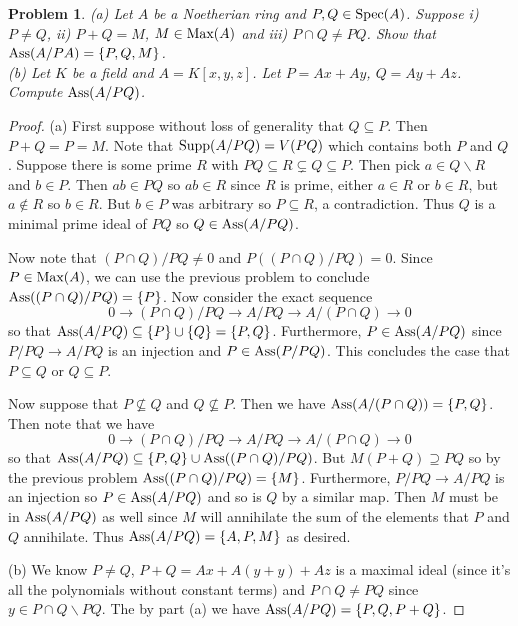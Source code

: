 \documentclass{article}
\newcommand{\ass}{\textup{Ass}}
\newcommand{\supp}{\textup{Supp}}
\newcommand{\spec}{\textup{Spec}}
\newcommand{\Max}{\textup{Max}}
\newtheorem{problem}{Problem}
\begin{document}
\begin{problem}
(a) Let $A$ be a Noetherian ring and $P,Q \in \spec(A)$. Suppose i) $P \neq Q$, ii) $P + Q = M$, $M \in \Max(A)$ and iii) $P \cap Q \neq PQ$. Show that $\ass(A/PA) = \{P, Q, M\}$.\\
(b) Let $K$ be a field and $A = K[x,y,z]$. Let $P = Ax + Ay$, $Q = Ay + Az$. Compute $\ass(A/PQ)$.
\end{problem}
\begin{proof}
(a) First suppose without loss of generality that $Q \subseteq P$. Then $P + Q = P = M$. Note that $\supp(A/PQ) = V(PQ)$ which contains both $P$ and $Q$. Suppose there is some prime $R$ with $PQ \subseteq R \subsetneq Q \subseteq P$. Then pick $a \in Q \backslash R$ and $b \in P$. Then $ab \in PQ$ so $ab \in R$ since $R$ is prime, either $a \in R$ or $b \in R$, but $a \notin R$ so $b \in R$. But $b \in P$ was arbitrary so $P \subseteq R$, a contradiction. Thus $Q$ is a minimal prime ideal of $PQ$ so $Q \in \ass(A/PQ)$.

Now note that $(P \cap Q)/PQ \neq 0$ and $P((P \cap Q)/PQ) = 0$. Since $P \in \Max(A)$, we can use the previous problem to conclude $\ass((P \cap Q)/PQ) = \{P\}$. Now consider the exact sequence
\[
0 \to (P \cap Q)/PQ \to A/PQ \to A/(P \cap Q) \to 0
\]
so that $\ass(A/PQ) \subseteq \{P\} \cup \{Q\} = \{P,Q\}$. Furthermore, $P \in \ass(A/PQ)$ since $P/PQ \to A/PQ$ is an injection and $P \in \ass(P/PQ)$. This concludes the case that $P \subseteq Q$ or $Q \subseteq P$.

Now suppose that $P \nsubseteq Q$ and $Q \nsubseteq P$. Then we have $\ass(A/(P \cap Q)) = \{P, Q\}$. Then note that we have
\[
0 \to (P \cap Q)/PQ \to A/PQ \to A/(P \cap Q) \to 0
\]
so that $\ass(A/PQ) \subseteq \{P, Q\} \cup \ass((P \cap Q)/PQ)$. But $M(P + Q) \supseteq PQ$ so by the previous problem $\ass((P \cap Q)/PQ) = \{M\}$. Furthermore, $P/PQ \to A/PQ$ is an injection so $P \in \ass(A/PQ)$ and so is $Q$ by a similar map. Then $M$ must be in $\ass(A/PQ)$ as well since $M$ will annihilate the sum of the elements that $P$ and $Q$ annihilate. Thus $\ass(A/PQ) = \{A, P, M\}$ as desired.

(b) We know $P \neq Q$, $P + Q = Ax + A(y + y)  + Az$ is a maximal ideal (since it's all the polynomials without constant terms) and $P \cap Q \neq PQ$ since $y \in P \cap Q \backslash PQ$. The by part (a) we have $\ass(A/PQ) = \{P, Q, P + Q\}$.
\end{proof}
\end{document}
